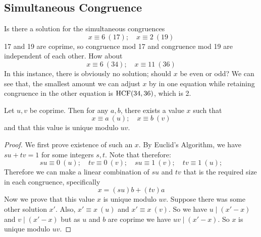 \subsection{Simultaneous Congruence}
Is there a solution for the simultaneous congruences
\[ x \equiv 6\ (17);\quad x \equiv 2\ (19) \]
17 and 19 are coprime, so congruence mod 17 and congruence mod 19 are independent of each other. How about
\[ x \equiv 6\ (34);\quad x \equiv 11\ (36) \]
In this instance, there is obviously no solution; should $x$ be even or odd? We can see that, the smallest amount we can adjust $x$ by in one equation while retaining congruence in the other equation is $\operatorname{HCF}(34, 36)$, which is 2.
\begin{theorem}
	Let $u, v$ be coprime. Then for any $a, b$, there exists a value $x$ such that
	\[ x \equiv a\ (u);\quad x \equiv b\ (v) \]
	and that this value is unique modulo $uv$.
\end{theorem}
\begin{proof}
	We first prove existence of such an $x$. By Euclid's Algorithm, we have $su + tv = 1$ for some integers $s, t$. Note that therefore:
	\[ su \equiv 0\ (u);\quad tv \equiv 0\ (v);\quad su \equiv 1\ (v);\quad tv \equiv 1\ (u); \]
	Therefore we can make a linear combination of $su$ and $tv$ that is the required size in each congruence, specifically
	\[ x = (su)b + (tv)a \]
	Now we prove that this value $x$ is unique modulo $uv$. Suppose there was some other solution $x'$. Also, $x' \equiv x\ (u)$ and $x' \equiv x\ (v)$. So we have $u\mid (x' - x)$ and $v\mid (x' - x)$ but as $u$ and $b$ are coprime we have $uv\mid (x' - x)$. So $x$ is unique modulo $uv$.
\end{proof}
